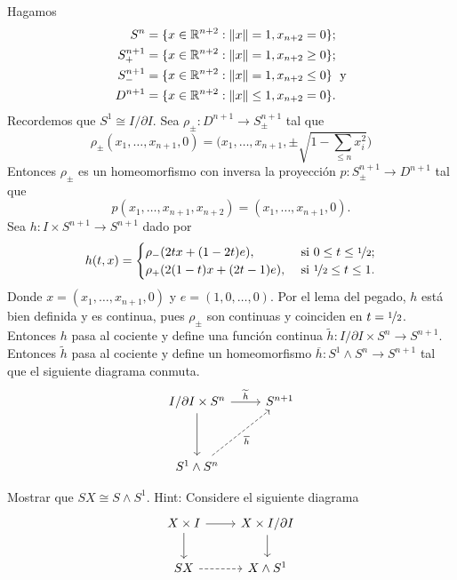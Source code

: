 \begin{dem}
    Hagamos 
    \begin{align*}
        S^{n}&=\{x\in\mathbb{R}^{n+2}:\|x\|=1,x_{n+2}=0 \};\\
        S^{n+1}_+&=\{x\in\mathbb{R}^{n+2}:\|x\|=1,x_{n+2}\geq 0 \};\\
        S^{n+1}_-&=\{x\in\mathbb{R}^{n+2}:\|x\|=1,x_{n+2}\leq 0 \}\text{\; y}\\
        D^{n+1}&=\{x\in\mathbb{R}^{n+2}:\|x\|\leq 1,x_{n+2}=0 \}.
    \end{align*}
    Recordemos que $S^1\cong I/\partial I$. Sea $\rho_\pm:D^{n+1}\to S_{\pm}^{n+1}$ tal que
    \begin{equation*}
        \rho_{\pm}(x_1,\ldots,x_{n+1},0)=\big(x_1,\ldots,x_{n+1},\textstyle\pm\sqrt{1-\sum_{\leq n}x_i^2}\big)
    \end{equation*}
    Entonces $\rho_\pm$ es un homeomorfismo con inversa la proyección $p:S_\pm^{n+1}\to D^{n+1}$ tal que 
    \begin{equation*}
        p(x_1,\ldots,x_{n+1},x_{n+2})=(x_1,\ldots,x_{n+1},0).
    \end{equation*}
    Sea $h:I\times S^{n+1}\to S^{n+1}$ dado por 
    \begin{equation*}
        h(t,x)=\begin{cases}
            \rho_-(2tx+(1-2t)e), & \text{ si } 0\leq t\leq\nicefrac{1}{2};\\
            \rho_+(2(1-t)x+(2t-1)e), & \text{ si } \nicefrac{1}{2}\leq t\leq 1.
        \end{cases}
    \end{equation*}
    Donde $x=(x_1,\ldots,x_{n+1},0)$ y $e=(1,0,\ldots,0)$. Por el lema del pegado, $h$ está bien definida y es continua, pues $\rho_\pm$ son continuas y coinciden en $t=\nicefrac{1}{2}$. Entonces $h$ pasa al cociente y define una función continua $\widetilde{h}:I/\partial I\times S^{n}\to S^{n+1}$. Entonces $\widetilde{h}$ pasa al cociente y define un homeomorfismo $\overline{h}:S^1\wedge S^n\to S^{n+1}$  tal que el siguiente diagrama conmuta.
    \begin{equation*}
    \begin{tikzcd}[row sep = 1.2cm]
         I/\partial I\times S^n \arrow[r,"\widetilde{h}"] \arrow[d] & S^{n+1}\\
        S^1\wedge S^n\arrow[ur, dashed,"\overline{h}"']
    \end{tikzcd}
    \end{equation*}
    \end{dem}
\begin{ejercicio}
\label{eje:SX cong S wedge S1}
    Mostrar que $SX\cong S\wedge S^1$. Hint: Considere el siguiente diagrama
    \begin{equation*}
        \begin{tikzcd}
            X\times I\arrow[r]\arrow[d] & X\times I/\partial I\arrow[d]\\
            SX\arrow[r,dashed] & X\wedge S^1
        \end{tikzcd}
    \end{equation*}
\end{ejercicio}

